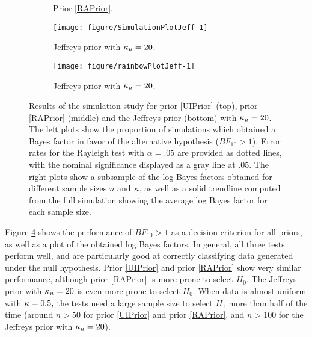 \begin{figure}
\begin{subfigure}[t]{0.5\linewidth}
\begin{knitrout}
\end{knitrout}
    \caption{Prior \ref{RAPrior}.}\label{fig:logBFplotConjugate2}
  \end{subfigure}
  \begin{subfigure}[t]{0.5\linewidth}\centering
\begin{knitrout}
\color{fgcolor}
\texttt{[image: figure/SimulationPlotJeff-1]} 

\end{knitrout}
    \caption{Jeffreys prior with \(\kappa_u = 20\).}\label{fig:simjefferror}
  \end{subfigure}%
  \begin{subfigure}[t]{0.5\linewidth}\centering
\begin{knitrout}
\color{fgcolor}
\texttt{[image: figure/rainbowPlotJeff-1]} 

\end{knitrout}
    \caption{Jeffreys prior with \(\kappa_u = 20\).}\label{fig:simjeffbfs}
  \end{subfigure}
  \caption{Results of the simulation study for prior \ref{UIPrior} (top), prior \ref{RAPrior} (middle) and the Jeffreys prior (bottom) with \(\kappa_u = 20\). The left plots show the proportion of simulations which  obtained a Bayes factor in favor of the alternative hypothesis (\(BF_{10} > 1\)). Error rates for the Rayleigh test with \(\alpha = .05\) are provided as dotted lines, with the nominal significance displayed as a gray line at \(.05\).   The right plots show a subsample of the log-Bayes factors obtained for different sample sizes \(n\) and \(\kappa\), as well as a solid trendline computed from the full simulation showing the average log Bayes factor for each sample size.}
  \label{fig:vmresults}
\end{figure}

Figure \ref{fig:vmresults} shows the performance of \( BF_{10} > 1 \) as a decision criterion for all priors, as well as a plot of the obtained log Bayes factors. In general, all three tests perform well, and are particularly good at correctly classifying data generated under the null hypothesis. Prior \ref{UIPrior} and prior \ref{RAPrior} show very similar performance, although prior \ref{RAPrior} is more prone to select \(H_0\). The Jeffreys prior with \( \kappa_u = 20 \) is even more prone to select \(H_0.\) When data is almost uniform with \( \kappa = 0.5,\) the tests need a large sample size to select \( H_1 \) more than half of the time (around \(n > 50\) for prior \ref{UIPrior} and prior \ref{RAPrior}, and \(n > 100\) for the Jeffreys prior with \(\kappa_u = 20\)).

